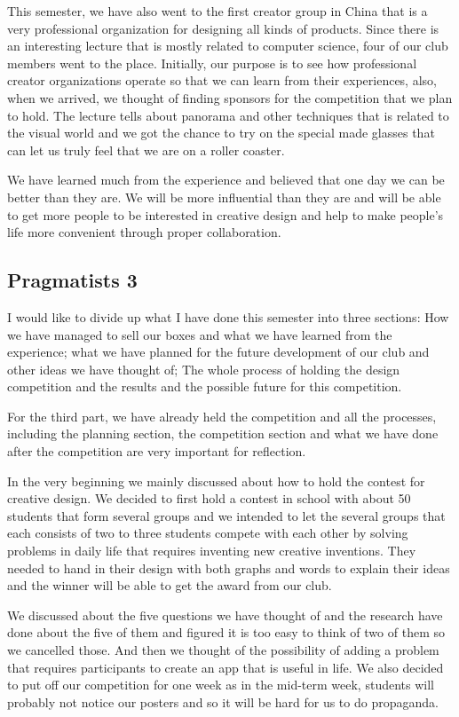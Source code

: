 \documentclass[11pt,a4paper,titlepage]{article}
\begin{document}
This semester, we have also went to the first creator group in China that is a very professional organization for designing all kinds of products. Since there is an interesting lecture that is mostly related to computer science, four of our club members went to the place. Initially, our purpose is to see how professional creator organizations operate so that we can learn from their experiences, also, when we arrived, we thought of finding sponsors for the competition that we plan to hold. The lecture tells about panorama and other techniques that is related to the visual world and we got the chance to try on the special made glasses that can let us truly feel that we are on a roller coaster.

We have learned much from the experience and believed that one day we can be better than they are. We will be more influential than they are and will be able to get more people to be interested in creative design and help to make people’s life more convenient through proper collaboration.

\subsection{Pragmatists 3}
I would like to divide up what I have done this semester into three sections: How we have managed to sell our boxes and what we have learned from the experience; what we have planned for the future development of our club and other ideas we have thought of; The whole process of holding the design competition and the results and the possible future for this competition.

For the third part, we have already held the competition and all the processes, including the planning section, the competition section and what we have done after the competition are very important for reflection.

In the very beginning we mainly discussed about how to hold the contest for creative design. We decided to first hold a contest in school with about 50 students that form several groups and we intended to let the several groups that each consists of two to three students compete with each other by solving problems in daily life that requires inventing new creative inventions. They needed to hand in their design with both graphs and words to explain their ideas and the winner will be able to get the award from our club.

We discussed about the five questions we have thought of and the research have done about the five of them and figured it is too easy to think of two of them so we cancelled those. And then we thought of the possibility of adding a problem that requires participants to create an app that is useful in life. We also decided to put off our competition for one week as in the mid-term week, students will probably not notice our posters and so it will be hard for us to do propaganda.
\end{document}
